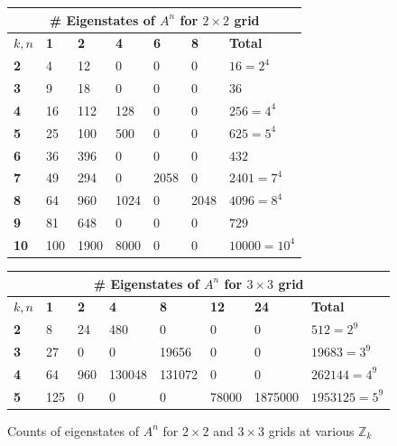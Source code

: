 \documentclass[11pt]{article}
\newcommand{\modZ}[1]{$\mathbb{Z}_{#1}$}
\begin{document}
\begin{figure}
  \caption{Counts of eigenstates of $A^n$ for $2 \times 2$ and $3 \times 3$ grids at various \modZ{k}}
  \label{eigencounts}

  \begin{center}
  \begin{tabular}{|l|l|l|l|l|l|l|}
    \hline
    \multicolumn{7}{|c|}{\# Eigenstates of $A^n$ for $2 \times 2$ grid} \\ \hline
    $k, n$&\textbf{1}&\textbf{2}&\textbf{4}&\textbf{6}&\textbf{8}&\textbf{Total}\\ \hline
    \textbf{2}  & 4   & 12   & 0    & 0    & 0    & $16=2^4$ \\ \hline
    \textbf{3}  & 9   & 18   & 0    & 0    & 0    & $36$ \\ \hline
    \textbf{4}  & 16  & 112  & 128  & 0    & 0    & $256=4^4$ \\ \hline
    \textbf{5}  & 25  & 100  & 500  & 0    & 0    & $625=5^4$ \\ \hline
    \textbf{6}  & 36  & 396  & 0    & 0    & 0    & $432$ \\ \hline
    \textbf{7}  & 49  & 294  & 0    & 2058 & 0    & $2401=7^4$ \\ \hline
    \textbf{8}  & 64  & 960  & 1024 & 0    & 2048 & $4096=8^4$ \\ \hline
    \textbf{9}  & 81  & 648  & 0    & 0    & 0    & $729$ \\ \hline
    \textbf{10} & 100 & 1900 & 8000 & 0    & 0    & $10000=10^4$ \\ \hline
  \end{tabular}
  \vspace{0.5cm}

  \begin{tabular}{|l|l|l|l|l|l|l|l|}
    \hline
    \multicolumn{8}{|c|}{\# Eigenstates of $A^n$ for $3 \times 3$ grid} \\ \hline
    $k, n$&\textbf{1}&\textbf{2}&\textbf{4}&\textbf{8}&\textbf{12}&\textbf{24}&\textbf{Total}\\ \hline
    \textbf{2}  & 8   & 24   & 480    & 0      & 0     & 0       & $512=2^9$ \\ \hline
    \textbf{3}  & 27  & 0    & 0      & 19656  & 0     & 0       & $19683=3^9$ \\ \hline
    \textbf{4}  & 64  & 960  & 130048 & 131072 & 0     & 0       & $262144=4^9$ \\ \hline
    \textbf{5}  & 125 & 0    & 0      & 0      & 78000 & 1875000 & $1953125=5^9$ \\ \hline
  \end{tabular}
  \end{center}
\end{figure}
\end{document}
